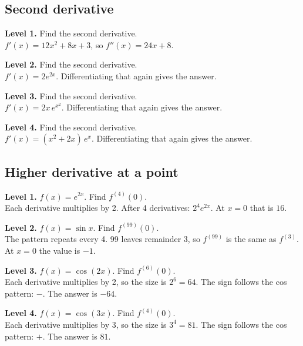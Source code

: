 \documentclass[11pt]{article}
\begin{document}
\subsection*{Second derivative}
\noindent\textbf{Level 1.} Find the second derivative.\\  \quad $f'(x)=12x^{2}+8x+3$, so $f''(x)=24x+8$.\par\medskip
\noindent\textbf{Level 2.} Find the second derivative.\\  \quad $f'(x)=2e^{2x}$. Differentiating that again gives the answer.\par\medskip
\noindent\textbf{Level 3.} Find the second derivative.\\  \quad $f'(x)=2x\,e^{x^{2}}$. Differentiating that again gives the answer.\par\medskip
\noindent\textbf{Level 4.} Find the second derivative.\\  \quad $f'(x)=(x^{2}+2x)\,e^{x}$. Differentiating that again gives the answer.\par\medskip
\subsection*{Higher derivative at a point}
\noindent\textbf{Level 1.} $f(x)=e^{2x}$. Find $f^{(4)}(0)$.\\  \quad Each derivative multiplies by 2. After 4 derivatives: $2^{4}e^{2x}$. At $x=0$ that is $16$.\par\medskip
\noindent\textbf{Level 2.} $f(x)=\sin x$. Find $f^{(99)}(0)$.\\  \quad The pattern repeats every 4. 99 leaves remainder 3, so $f^{(99)}$ is the same as $f^{(3)}$. At $x=0$ the value is $-1$.\par\medskip
\noindent\textbf{Level 3.} $f(x)=\cos(2x)$. Find $f^{(6)}(0)$.\\  \quad Each derivative multiplies by 2, so the size is $2^{6}=64$. The sign follows the cos pattern: $-$. The answer is $-64$.\par\medskip
\noindent\textbf{Level 4.} $f(x)=\cos(3x)$. Find $f^{(4)}(0)$.\\  \quad Each derivative multiplies by 3, so the size is $3^{4}=81$. The sign follows the cos pattern: $+$. The answer is $81$.\par\medskip
\end{document}
